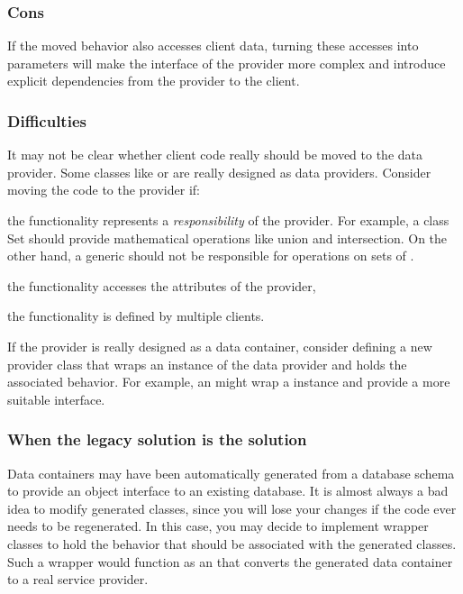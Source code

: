 \documentclass[a4paper,10pt,twoside]{book}
\begin{document}
\subsubsection*{Cons}

\begin{bulletlist}
\item If the moved behavior also accesses client data, turning these accesses into parameters will make the interface of the provider more complex and introduce explicit dependencies from the provider to the client.
\end{bulletlist}

\subsubsection*{Difficulties}

\begin{bulletlist}
\item It may not be clear whether client code really should be moved to the data provider. Some classes like  or  are really designed as data providers. Consider moving the code to the provider if:

\begin{bulletlist}
\item the functionality represents a \emph{responsibility} of the provider. For example, a class Set should provide mathematical operations like union and intersection. On the other hand, a generic  should not be responsible for operations on sets of .
\item the functionality accesses the attributes of the provider,
\item the functionality is defined by multiple clients.
\end{bulletlist}

\item If the provider is really designed as a data container, consider defining a new provider class that wraps an instance of the data provider and holds the associated behavior. For example, an  might wrap a  instance and provide a more suitable interface.
\end{bulletlist}

\subsubsection*{When the legacy solution is the solution}

Data containers may have been automatically generated from a database schema to provide an object interface to an existing database. It is almost always a bad idea to modify generated classes, since you will lose your changes if the code ever needs to be regenerated. In this case, you may decide to implement wrapper classes to hold the behavior that should be associated with the generated classes. Such a wrapper would function as an  that converts the generated data container to a real service provider. 
\end{document}
